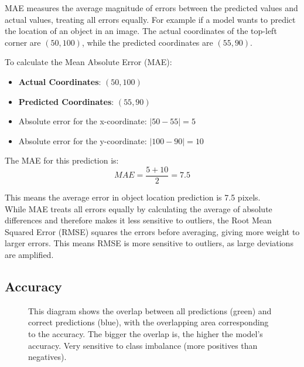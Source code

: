 \documentclass{article}
\begin{document}
MAE measures the average magnitude of errors between the predicted values and actual values, treating all errors equally. For example if a model wants to predict the location of an object in an image. The actual coordinates of the top-left corner are \((50, 100)\), while the predicted coordinates are \((55, 90)\).

To calculate the Mean Absolute Error (MAE):

\begin{itemize}
    \item \textbf{Actual Coordinates}: \((50, 100)\)
    \item \textbf{Predicted Coordinates}: \((55, 90)\)
    \item Absolute error for the x-coordinate: \( |50 - 55| = 5 \)
    \item Absolute error for the y-coordinate: \( |100 - 90| = 10 \)
\end{itemize}

The MAE for this prediction is:
\[MAE = \frac{5 + 10}{2} = 7.5\]

This means the average error in object location prediction is 7.5 pixels.
\\
While MAE treats all errors equally by calculating the average of absolute differences and therefore makes it less sensitive to outliers, the Root Mean Squared Error (RMSE) squares the errors before averaging, giving more weight to larger errors. This means RMSE is more sensitive to outliers, as large deviations are amplified.


\subsection{Accuracy}
\begin{figure}[h]
\centering
{}
    \caption{This diagram shows the overlap between all predictions (green) and correct predictions (blue), with the overlapping area corresponding to the accuracy. The bigger the overlap is, the higher the model's accuracy. Very sensitive to class imbalance (more positives than negatives).}
\end{figure}
\end{document}
